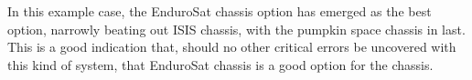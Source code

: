 In this example case, the EnduroSat chassis option has emerged as the best option, narrowly beating out ISIS chassis, with the pumpkin space chassis in last. This is a good indication that, should no other critical errors be uncovered with this kind of system, that EnduroSat chassis is a good option for the chassis.
